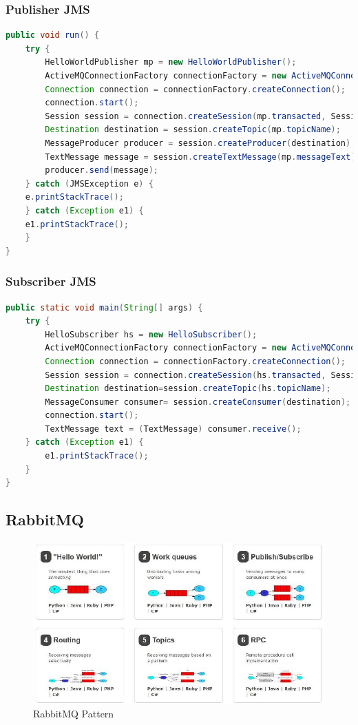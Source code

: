 \subsubsection{Publisher JMS}

\begin{lstlisting}[language=java]
public void run() {
	try {
		HelloWorldPublisher mp = new HelloWorldPublisher();
		ActiveMQConnectionFactory connectionFactory = new ActiveMQConnectionFactory(mp.user, mp.password, mp.url);
		Connection connection = connectionFactory.createConnection();
		connection.start();
		Session session = connection.createSession(mp.transacted, Session.AUTO_ACKNOWLEDGE);
		Destination destination = session.createTopic(mp.topicName);
		MessageProducer producer = session.createProducer(destination);
		TextMessage message = session.createTextMessage(mp.messageText);
		producer.send(message);
	} catch (JMSException e) {
	e.printStackTrace();
	} catch (Exception e1) {
	e1.printStackTrace();
	}
}
\end{lstlisting}


\subsubsection{Subscriber JMS}

\begin{lstlisting}[language=java]
public static void main(String[] args) {
	try {
		HelloSubscriber hs = new HelloSubscriber();
		ActiveMQConnectionFactory connectionFactory = new ActiveMQConnectionFactory(hs.user, hs.password, hs.url);
		Connection connection = connectionFactory.createConnection();
		Session session = connection.createSession(hs.transacted, Session.AUTO_ACKNOWLEDGE);
		Destination destination=session.createTopic(hs.topicName);
		MessageConsumer consumer= session.createConsumer(destination);
		connection.start();
		TextMessage text = (TextMessage) consumer.receive();
	} catch (Exception e1) {
		e1.printStackTrace();
	}
}
\end{lstlisting}


\subsection{RabbitMQ}

\begin{figure}[h!]
	\centering
	\includegraphics[width=0.8\linewidth]{img/rabbitmq_pattern}
	\caption{RabbitMQ Pattern}
	\label{fig:rabbitmqpattern}
\end{figure}


